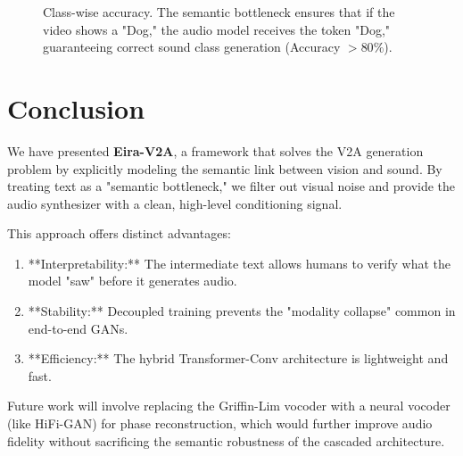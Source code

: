 \documentclass[conference, onecolumn]{IEEEtran}
\begin{document}
\begin{figure}[H]
\centering
{}
\caption{Class-wise accuracy. The semantic bottleneck ensures that if the video shows a "Dog," the audio model receives the token "Dog," guaranteeing correct sound class generation (Accuracy $>80\%$).}
\label{fig:semantic}
\end{figure}

\section{Conclusion}
We have presented \textbf{Eira-V2A}, a framework that solves the V2A generation problem by explicitly modeling the semantic link between vision and sound. By treating text as a "semantic bottleneck," we filter out visual noise and provide the audio synthesizer with a clean, high-level conditioning signal.

This approach offers distinct advantages:
\begin{enumerate}
    \item **Interpretability:** The intermediate text allows humans to verify what the model "saw" before it generates audio.
    \item **Stability:** Decoupled training prevents the "modality collapse" common in end-to-end GANs.
    \item **Efficiency:** The hybrid Transformer-Conv architecture is lightweight and fast.
\end{enumerate}

Future work will involve replacing the Griffin-Lim vocoder with a neural vocoder (like HiFi-GAN) for phase reconstruction, which would further improve audio fidelity without sacrificing the semantic robustness of the cascaded architecture.
\end{document}
